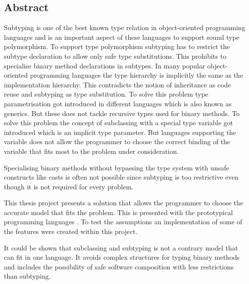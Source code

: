 %
%
\subsection*{Abstract}
Subtyping is one of the best known type relation in object-oriented
programming languages and is an important aspect of these languages
to support sound type polymorphism. To support type polymorphism
subtyping has to restrict the subtype declaration to allow only safe type
substitutions. This prohibits to specialise binary method declarations in
subtypes. In many popular object-oriented programming languages the type
hierarchy is implicitly the same as the implementation hierarchy. This
contradicts the notion of inheritance as code reuse and subtyping as type
substitution. To solve this problem type parametrisation got introduced in
different languages which is also known as generics. But these does not
tackle recursive types used for binary methods. To solve this problem
the concept of subclassing with a special type variable \mytype got
introduced which is an implicit type parameter. But languages supporting
the \mytype variable does not allow the programmer to choose the correct
binding of the variable that fits most to the problem under consideration.

Specialising binary methods without bypassing the type system with
unsafe constructs like casts is often not possible since subtyping is
too restrictive even though it is not required for every problem.

This thesis project presents a solution that allows the programmer to
choose the accurate model that fits the problem. This is presented with
the prototypical programming languages \ooplss. To test the assumptions an
implementation of some of the features were created within this project.

It could be shown that subclassing and subtyping is not a contrary model
that can fit in one language. It avoids complex structures for typing
binary methods and includes the possibility of safe software composition
with less restrictions than subtyping.



%
